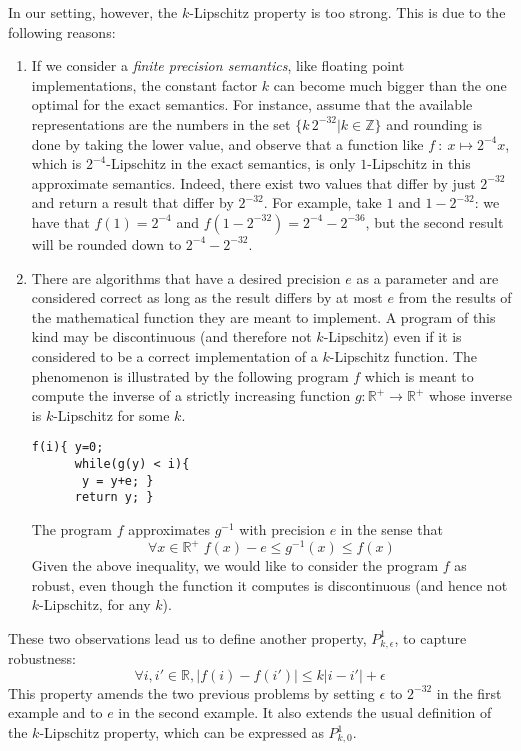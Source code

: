 \documentclass[copyright,creativecommons]{eptcs}
\newcommand{\R}{\mathbb{R}}
\begin{document}
In our setting, however, the $k$-Lipschitz property is too
strong. This is due to the following  reasons:
\begin{enumerate}
\item If we consider a \emph{finite precision semantics}, like
  floating point implementations, the constant factor $k$ can become
  much bigger than the one optimal for the exact semantics. For
  instance, assume that the available representations are the numbers
  in the set $\{ k\,2^{-32} | k \in \mathbb{Z}\}$ and rounding is done
  by taking the lower value, and observe that a function like $f~:~x
  \mapsto 2^{-4}x$, which is $2^{-4}$-Lipschitz in the exact semantics,
  is only $1$-Lipschitz in this approximate semantics. Indeed, there
  exist two values that differ by just $2^{-32}$ and return a result
  that differ by $2^{-32}$. For example, take $1$ and  $1- 2^{-32}$:
  we have that $f(1)=2^{-4}$ and $f(1- 2^{-32})=2^{-4}-2^{-36}$, but
  the   second result will be rounded down to $2^{-4}-2^{-32}$.


\item There are algorithms that have a desired precision $e$ as a
  parameter and are considered correct as long as the result differs
  by at most $e$ from the results of the mathematical function they
  are meant to implement.  A program of this kind may be discontinuous
  (and therefore not $k$-Lipschitz) even if it is considered to be a
  correct implementation of a $k$-Lipschitz function.  The phenomenon
  is illustrated by the following program $f$ which is meant to
  compute the inverse of a strictly increasing function
  $g:\R^+\rightarrow \R^+$ whose inverse is $k$-Lipschitz for some
  $k$.
{\begin{lstlisting}[language=pscode]
f(i){ y=0;
      while(g(y) < i){
	   y = y+e; }
      return y; }
\end{lstlisting}}   
 
The program $f$ approximates  $g^{-1}$ with precision $e$  in the sense that 
\[ 
\forall x\in \R^+ \; f(x) -e \leq g^{-1}(x) \leq f(x)
\]
Given the above inequality, we would like to consider the  program $f$
as robust, even though the function it computes is discontinuous (and
hence not $k$-Lipschitz, for any $k$). 

\end{enumerate}

These two observations lead us to define another property,
$P^1_{k,\epsilon}$, to capture robustness:  
\[\forall i,i' \in \R, |f(i)-f(i')| \leq k |i-i'| + \epsilon \]
This property amends the two previous problems by setting $\epsilon$ to
$2^{-32}$ in the first example and to $e$ in the second example.
It also extends the usual definition of the $k$-Lipschitz property, which can be expressed as $P^1_{k,0}$. 
\end{document}
